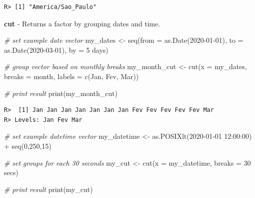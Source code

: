 \documentclass[
  12pt,
]{book}
\newenvironment{Shaded}{\begin{snugshade}}{\end{snugshade}}
\newcommand{\AttributeTok}[1]{\textcolor[rgb]{0.61,0.61,0.61}{#1}}
\newcommand{\CommentTok}[1]{\textcolor[rgb]{0.37,0.37,0.37}{\textit{#1}}}
\newcommand{\DecValTok}[1]{\textcolor[rgb]{0.06,0.06,0.06}{#1}}
\newcommand{\FunctionTok}[1]{\textcolor[rgb]{0,0,0}{#1}}
\newcommand{\NormalTok}[1]{#1}
\newcommand{\OtherTok}[1]{\textcolor[rgb]{0.37,0.37,0.37}{#1}}
\newcommand{\SpecialCharTok}[1]{\textcolor[rgb]{0,0,0}{#1}}
\newcommand{\StringTok}[1]{\textcolor[rgb]{0.5,0.5,0.5}{#1}}
\begin{document}
\begin{verbatim}
R> [1] "America/Sao_Paulo"
\end{verbatim}

\textbf{cut} - Returns a factor by grouping dates and time. 

\begin{Shaded}
\begin{Highlighting}[]
\CommentTok{\# set example date vector}
\NormalTok{my\_dates }\OtherTok{\textless{}{-}} \FunctionTok{seq}\NormalTok{(}\AttributeTok{from =} \FunctionTok{as.Date}\NormalTok{(}\StringTok{\textquotesingle{}2020{-}01{-}01\textquotesingle{}}\NormalTok{),}
                \AttributeTok{to =} \FunctionTok{as.Date}\NormalTok{(}\StringTok{\textquotesingle{}2020{-}03{-}01\textquotesingle{}}\NormalTok{),}
                \AttributeTok{by =} \StringTok{\textquotesingle{}5 days\textquotesingle{}}\NormalTok{)}

\CommentTok{\# group vector based on monthly breaks}
\NormalTok{my\_month\_cut }\OtherTok{\textless{}{-}} \FunctionTok{cut}\NormalTok{(}\AttributeTok{x =}\NormalTok{ my\_dates,}
                    \AttributeTok{breaks =} \StringTok{\textquotesingle{}month\textquotesingle{}}\NormalTok{,}
                    \AttributeTok{labels =} \FunctionTok{c}\NormalTok{(}\StringTok{\textquotesingle{}Jan\textquotesingle{}}\NormalTok{, }\StringTok{\textquotesingle{}Fev\textquotesingle{}}\NormalTok{, }\StringTok{\textquotesingle{}Mar\textquotesingle{}}\NormalTok{))}

\CommentTok{\# print result}
\FunctionTok{print}\NormalTok{(my\_month\_cut)}
\end{Highlighting}
\end{Shaded}

\begin{verbatim}
R>  [1] Jan Jan Jan Jan Jan Jan Jan Fev Fev Fev Fev Fev Mar
R> Levels: Jan Fev Mar
\end{verbatim}

\begin{Shaded}
\begin{Highlighting}[]
\CommentTok{\# set example datetime vector}
\NormalTok{my\_datetime }\OtherTok{\textless{}{-}} \FunctionTok{as.POSIXlt}\NormalTok{(}\StringTok{\textquotesingle{}2020{-}01{-}01 12:00:00\textquotesingle{}}\NormalTok{) }\SpecialCharTok{+} \FunctionTok{seq}\NormalTok{(}\DecValTok{0}\NormalTok{,}\DecValTok{250}\NormalTok{,}\DecValTok{15}\NormalTok{)}

\CommentTok{\# set groups for each 30 seconds}
\NormalTok{my\_cut }\OtherTok{\textless{}{-}} \FunctionTok{cut}\NormalTok{(}\AttributeTok{x =}\NormalTok{ my\_datetime, }\AttributeTok{breaks =} \StringTok{\textquotesingle{}30 secs\textquotesingle{}}\NormalTok{)}

\CommentTok{\# print result}
\FunctionTok{print}\NormalTok{(my\_cut)}
\end{Highlighting}
\end{Shaded}
\end{document}

